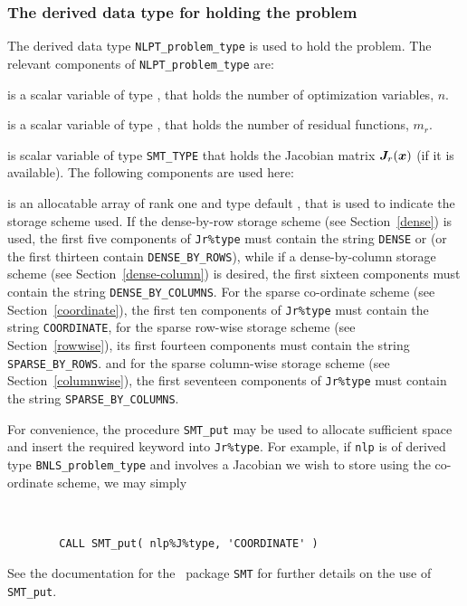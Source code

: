 \documentclass{galahad}
\newcommand{\packagename}{BNLS}
\begin{document}

\subsubsection{The derived data type for holding the problem}\label{typeprob}
The derived data type {\tt NLPT\_problem\_type} is used to hold
the problem. The relevant components of
{\tt NLPT\_problem\_type}
are:

\begin{description}

 is a scalar variable of type \integer,
 that holds the number of optimization variables, $n$.

 is a scalar variable of type \integer,
 that holds the number of residual functions, $m_r$.



 is scalar variable of type {\tt SMT\_TYPE}
that holds the Jacobian matrix ${\bm{J}}_r({\bm{x}})$ (if it is available).
The following components are used here:

\begin{description}

 is an allocatable array of rank one and type default
\character, that
is used to indicate the storage scheme used. If the dense-by-row storage scheme
(see Section~\ref{dense}) is used,
the first five components of {\tt Jr\%type} must contain the
string {\tt DENSE} or (or the first thirteen contain {\tt DENSE\_BY\_ROWS}), 
while if a  dense-by-column storage scheme (see Section~\ref{dense-column}) 
is desired, the first sixteen components must contain the string 
{\tt DENSE\_BY\_COLUMNS}.
For the sparse co-ordinate scheme (see Section~\ref{coordinate}),
the first ten components of {\tt Jr\%type} must contain the
string {\tt COORDINATE},
for the sparse row-wise storage scheme (see Section~\ref{rowwise}),
its first fourteen components must contain the
string {\tt SPARSE\_BY\_ROWS}.
and for the sparse column-wise storage scheme (see Section~\ref{columnwise}),
the first seventeen components of {\tt Jr\%type} must contain the
string {\tt SPARSE\_BY\_COLUMNS}.

For convenience, the procedure {\tt SMT\_put}
may be used to allocate sufficient space and insert the required keyword
into {\tt Jr\%type}.
For example, if {\tt nlp} is of derived type {\tt \packagename\_problem\_type}
and involves a Jacobian we wish to store using the co-ordinate scheme,
we may simply
{\tt
\begin{verbatim}
        CALL SMT_put( nlp%J%type, 'COORDINATE' )
\end{verbatim}
}
\noindent
See the documentation for the \galahad\ package {\tt SMT}
for further details on the use of {\tt SMT\_put}.


\end{description}
\end{description}
\end{document}
